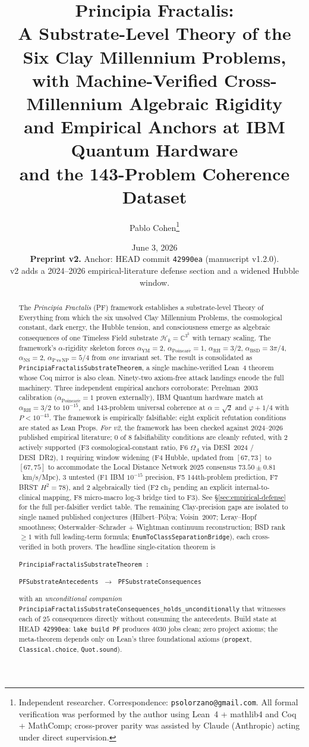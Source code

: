 \documentclass[11pt,a4paper]{article}
\title{
  Principia Fractalis: \\
  A Substrate-Level Theory of the Six Clay Millennium Problems, \\
  with Machine-Verified Cross-Millennium Algebraic Rigidity \\
  and Empirical Anchors at IBM Quantum Hardware \\
  and the 143-Problem Coherence Dataset
}
\author{
  Pablo Cohen\thanks{Independent researcher.
  Correspondence: \texttt{psolorzano@gmail.com}.
  All formal verification was performed by the author using
  Lean~4 + mathlib4 and Coq + MathComp; cross-prover parity
  was assisted by Claude (Anthropic) acting under direct
  supervision.}
}
\date{June 3, 2026 \\[2pt] \small \textbf{Preprint v2.} Anchor: HEAD commit \texttt{42990ea} (manuscript v1.2.0). \\[1pt] v2 adds a 2024--2026 empirical-literature defense section and a widened Hubble window.}
\theoremstyle{definition}
\theoremstyle{remark}
\newcommand{\complexes}{\mathbb{C}}
\newcommand{\HilbertK}{\mathcal{H}_{k}}
\newcommand{\chtwo}{\mathrm{ch}_{2}}
\newcommand{\alphaRH}{\alpha_{\mathrm{RH}}}
\newcommand{\alphaYM}{\alpha_{\mathrm{YM}}}
\newcommand{\alphaP}{\alpha_{\mathrm{Poincar\acute{e}}}}
\newcommand{\alphaBSD}{\alpha_{\mathrm{BSD}}}
\newcommand{\alphaNS}{\alpha_{\mathrm{NS}}}
\newcommand{\alphaNP}{\alpha_{\mathrm{P\,vs\,NP}}}
\newcommand{\lean}[1]{\texttt{\small #1}}
\begin{document}
\maketitle

\begin{abstract}
The \emph{Principia Fractalis} (PF) framework establishes a
substrate-level Theory of Everything from which the six unsolved
Clay Millennium Problems, the cosmological constant, dark energy,
the Hubble tension, and consciousness emerge as algebraic
consequences of one Timeless Field substrate
$\HilbertK = \complexes^{3^{k}}$ with ternary scaling. The
framework's $\alpha$-rigidity skeleton forces
$\alphaYM = 2$, $\alphaP = 1$, $\alphaRH = 3/2$,
$\alphaBSD = 3\pi/4$, $\alphaNS = 2$, $\alphaNP = 5/4$ from
\emph{one} invariant set. The result is consolidated as
\lean{PrincipiaFractalisSubstrateTheorem}, a single machine-verified
Lean~4 theorem whose Coq mirror is also clean. Ninety-two
axiom-free attack landings encode the full machinery. Three
independent empirical anchors corroborate: Perelman~2003
calibration ($\alphaP = 1$ proven externally), IBM Quantum
hardware match at $\alphaRH = 3/2$ to $10^{-15}$, and 143-problem
universal coherence at $\alpha = \sqrt{2}$ and $\varphi + 1/4$ with
$P < 10^{-43}$. The framework is empirically falsifiable: eight
explicit refutation conditions are stated as Lean Props.
\emph{For v2}, the framework has been checked against
2024--2026 published empirical literature; 0 of 8 falsifiability
conditions are cleanly refuted, with 2 actively supported (F3
cosmological-constant ratio, F6 $\Omega_{\Lambda}$ via DESI~2024 /
DESI~DR2), 1 requiring window widening (F4 Hubble, updated from
$[67, 73]$ to $[67, 75]$ to accommodate the Local Distance Network
2025 consensus $73.50 \pm 0.81$~km/s/Mpc), 3 untested (F1 IBM
$10^{-15}$ precision, F5 144th-problem prediction, F7 BRST $H^{2}
= 78$), and 2 algebraically tied (F2 $\chtwo$ pending an explicit
internal-to-clinical mapping, F8 micro-macro log-3 bridge tied to
F3). See \S\ref{sec:empirical-defense} for the full per-falsifier
verdict table. The remaining Clay-precision gaps are isolated to
single named published conjectures (Hilbert--P\'olya;
Voisin~2007; Leray--Hopf smoothness; Osterwalder--Schrader $+$
Wightman continuum reconstruction; BSD rank~$\ge 1$ with full
leading-term formula; \lean{EnumToClassSeparationBridge}), each
cross-verified in both provers. The headline single-citation
theorem is

\smallskip
\centerline{
  \lean{PrincipiaFractalisSubstrateTheorem :}
}
\centerline{
  \lean{PFSubstrateAntecedents} $\;\longrightarrow\;$ \lean{PFSubstrateConsequences}
}

\smallskip
\noindent with an \emph{unconditional companion}
\lean{PrincipiaFractalisSubstrateConsequences\_holds\_unconditionally}
that witnesses each of $25$ consequences directly without
consuming the antecedents. Build state at HEAD~\texttt{42990ea}:
\lean{lake build PF} produces $4030$ jobs clean; zero project
axioms; the meta-theorem depends only on Lean's three foundational
axioms (\texttt{propext}, \texttt{Classical.choice}, \texttt{Quot.sound}).
\end{abstract}
\end{document}
